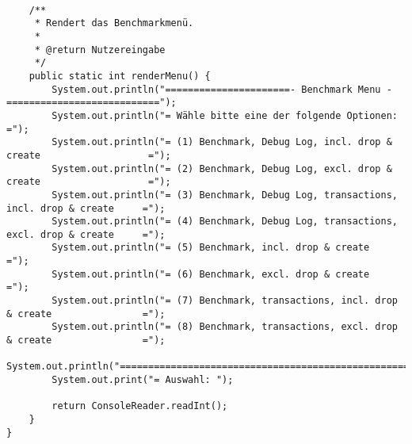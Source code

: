 \begin{lstlisting}[caption={Main}, label={lst:mainv2}]
	
	/**
	 * Rendert das Benchmarkmenü.
	 * 
	 * @return Nutzereingabe
	 */
	public static int renderMenu() {
		System.out.println("======================- Benchmark Menu -===========================");
		System.out.println("= Wähle bitte eine der folgende Optionen:                         =");
		System.out.println("= (1) Benchmark, Debug Log, incl. drop & create                   =");
		System.out.println("= (2) Benchmark, Debug Log, excl. drop & create                   =");
		System.out.println("= (3) Benchmark, Debug Log, transactions, incl. drop & create     =");
		System.out.println("= (4) Benchmark, Debug Log, transactions, excl. drop & create     =");
		System.out.println("= (5) Benchmark, incl. drop & create                              =");
		System.out.println("= (6) Benchmark, excl. drop & create                              =");
		System.out.println("= (7) Benchmark, transactions, incl. drop & create                =");
		System.out.println("= (8) Benchmark, transactions, excl. drop & create                =");
		System.out.println("===================================================================");
		System.out.print("= Auswahl: ");
		
		return ConsoleReader.readInt();
	}
}
\end{lstlisting}

